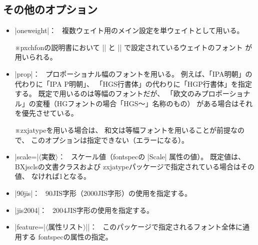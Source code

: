 \documentclass[xelatex,ja=standard,a4paper]{bxjsarticle}
\newcommand{\Pkg}[1]{\textsf{#1}}
\newcommand{\Meta}[1]{$\langle$\mbox{}#1\mbox{}$\rangle$}
\newcommand{\Note}{\par\noindent ※}
\newcommand{\Means}{：\ }
\begin{document}
\subsection{その他のオプション}

\begin{itemize}
\item |oneweight|\Means
複数ウェイト用のメイン設定を単ウェイトとして用いる。
\Note \Pkg{pxchfon}の説明書において |\setminchofont|
と |\setgothicfont| で設定されているウェイトのフォント
が用いられる。

\item |prop|\Means
プロポーショナル幅のフォントを用いる。
例えば、「IPA明朝」の代わりに「IPA P明朝」、
「HGS行書体」の代わりに「HGP行書体」を指定する。
既定で用いるのは等幅のフォントだが、
「欧文のみプロポーショナル」の変種（HGフォントの場合「HGS～」名称のもの）
がある場合はそれを優先させている。
\Note \Pkg{zxjatype}を用いる場合は、
和文は等幅フォントを用いることが前提なので、
このオプションは指定できない（エラーになる）。

\item |scale=|\Meta{実数}\Means
スケール値（\Pkg{fontspec}の |Scale| 属性の値）。
既定値は、\Pkg{BXjscls}の文書クラスおよび
\Pkg{zxjatype}パッケージで指定されている場合はその値、
なければ1となる。

\item |90jis|\Means
90JIS字形（2000JIS字形）の使用を指定する。

\item |jis2004|\Means
2004JIS字形の使用を指定する。

\item |feature={|\Meta{属性リスト}|}|\Means
このパッケージで指定されるフォント全体に通用する
\Pkg{fontspec}の属性の指定。

\end{itemize}

\end{document}
